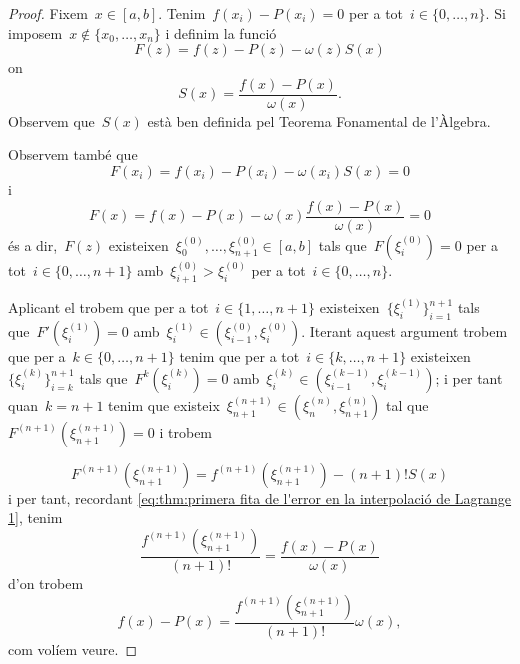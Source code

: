 \documentclass[../../main.tex]{subfiles}
\begin{document}
    \begin{proof}
        Fixem~\(x\in[a,b]\).
        Tenim~\(f(x_{i})-P(x_{i})=0\) per a tot~\(i\in\{0,\dots,n\}\).
        Si imposem~\(x\notin\{x_{0},\dots,x_{n}\}\) i definim la funció
        \[
            F(z)=f(z)-P(z)-\omega(z)S(x)
        \]
        on
        \begin{equation}\label{eq:thm:primera fita de l'error en la interpolació de Lagrange 1}
        S(x)=\frac{f(x)-P(x)}{\omega(x)}.
        \end{equation}
        Observem que~\(S(x)\) està ben definida pel Teorema Fonamental de l'Àlgebra.

        Observem també que
        \[
            F(x_{i})=f(x_{i})-P(x_{i})-\omega(x_{i})S(x)=0
        \]
        i
        \[
            F(x)=f(x)-P(x)-\omega(x)\frac{f(x)-P(x)}{\omega(x)}=0
        \]
        és a dir,~\(F(z)\) existeixen~\(\xi^{(0)}_{0},\dots,\xi^{(0)}_{n+1}\in[a,b]\) tals que~\(F(\xi^{(0)}_{i})=0\) per a tot~\(i\in\{0,\dots,n+1\}\) amb~\(\xi^{(0)}_{i+1}>\xi^{(0)}_{i}\) per a tot~\(i\in\{0,\dots,n\}\).

        Aplicant el  trobem que per a tot~\(i\in\{1,\dots,n+1\}\) existeixen~\(\{\xi^{(1)}_{i}\}_{i=1}^{n+1}\) tals que~\(F'(\xi^{(1)}_{i})=0\) amb~\(\xi^{(1)}_{i}\in(\xi^{(0)}_{i-1},\xi^{(0)}_{i})\).
        Iterant aquest argument trobem que per a~\(k\in\{0,\dots,n+1\}\) tenim que per a tot~\(i\in\{k,\dots,n+1\}\) existeixen~\(\{\xi^{(k)}_{i}\}_{i=k}^{n+1}\) tals que~\(F^{k}(\xi^{(k)}_{i})=0\) amb~\(\xi^{(k)}_{i}\in(\xi^{(k-1)}_{i-1},\xi^{(k-1)}_{i})\); i per tant quan~\(k=n+1\) tenim que existeix~\(\xi^{(n+1)}_{n+1}\in(\xi^{(n)}_{n},\xi^{(n)}_{n+1})\) tal que~\(F^{(n+1)}(\xi^{(n+1)}_{n+1})=0\) i trobem%
            \begin{comment}
                \marginpar{Dime si es verdad\\
                Que alguien ha logrado escapar de esta tela de araña.\\
                Dime cuanto cuesta\hfil\twonotes\hfil\\
                Saber la puta verdad\\
                Y quien le pone precio.}
            \end{comment}
        \[
            F^{(n+1)}(\xi^{(n+1)}_{n+1})=f^{(n+1)}(\xi^{(n+1)}_{n+1})-(n+1)!S(x)
        \]%
        i per tant, recordant \eqref{eq:thm:primera fita de l'error en la interpolació de Lagrange 1}, tenim
        \[
            \frac{f^{(n+1)}(\xi^{(n+1)}_{n+1})}{(n+1)!}=\frac{f(x)-P(x)}{\omega(x)}
        \]
        d'on trobem
        \[
            f(x)-P(x)=\frac{f^{(n+1)}(\xi^{(n+1)}_{n+1})}{(n+1)!}\omega(x),
        \]
        com volíem veure.
    \end{proof}
\end{document}
